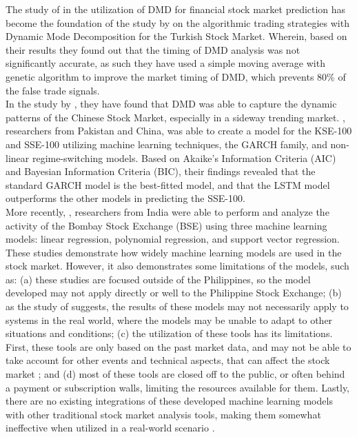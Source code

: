 The study of  in the utilization of DMD for financial stock market 
prediction has become the foundation of the study by  
on the algorithmic trading strategies with Dynamic Mode Decomposition 
for the Turkish Stock Market. Wherein, based on their results they found out 
that the timing of DMD analysis was not significantly accurate, as such they 
have used a simple moving average with genetic algorithm to improve the market 
timing of DMD, which prevents 80\% of the false trade signals.
\\

In the study by , they have found that DMD was able to capture the 
dynamic patterns of the Chinese Stock Market, especially in a sideway trending market.
, researchers from Pakistan and China, was able to 
create a model for the KSE-100 and SSE-100 utilizing machine learning techniques, the GARCH 
family, and non-linear regime-switching models. Based on Akaike's Information Criteria (AIC) 
and Bayesian Information Criteria (BIC), their findings revealed that the standard GARCH model 
is the best-fitted model, and that the LSTM model outperforms the other models in predicting 
the SSE-100.
\\

More recently, , researchers from India were able 
to perform and analyze the activity of the Bombay Stock Exchange (BSE) using three machine learning models: 
linear regression, polynomial regression, and support vector regression.
\\

These studies demonstrate how widely machine learning models are used in the stock market. 
However, it also demonstrates some limitations of the models, such as: (a) these studies 
are focused outside of the Philippines, so the model developed may not apply directly or 
well to the Philippine Stock Exchange; (b) as the study of  suggests, the results 
of these models may not necessarily apply to systems in the real world, where the models 
may be unable to adapt to other situations and conditions; 
(c) the utilization of these tools has its limitations. First, these tools
are only based on the past market data, and may not be able to take account
for other events and technical aspects, that can affect the stock market
\cite{Concoda2020}; and (d) most of these tools are closed off to the public, or often behind a 
payment or subscription walls, limiting the resources available for them.
Lastly, there are no existing integrations of these developed machine learning
models with other traditional stock market analysis tools, making them somewhat
ineffective when utilized in a real-world scenario
\cite{CHHAJER2022100015, zou2023stock}.
\\

